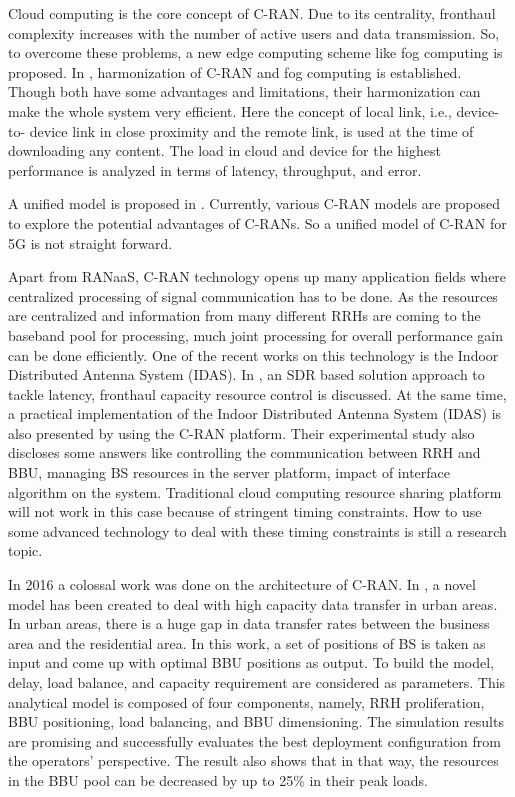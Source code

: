 \begin{multicols}{2}
Cloud computing is the core concept of C-RAN. Due to its centrality, fronthaul complexity increases with the number of active users and data transmission. So, to overcome these problems, a new edge computing scheme like fog computing is proposed. In \cite{art3-key21}, harmonization of C-RAN and fog computing is established. Though both have some advantages and limitations, their harmonization can make the whole system very efficient. Here the concept of local link, i.e., device-to- device link in close proximity and the remote link, is used at the time of downloading any content. The load in cloud and device for the highest performance is analyzed in terms of latency, throughput, and error.

A unified model is proposed in \cite{art3-key22}. Currently, various C-RAN models are proposed to explore the potential advantages of C-RANs. So a unified model of C-RAN for 5G is not straight forward.

Apart from RANaaS, C-RAN technology opens up many application fields where centralized processing of signal communication has to be done. As the resources are centralized and information from many different RRHs are coming to the baseband pool for processing, much joint processing for overall performance gain can be done efficiently. One of the recent works on this technology is the Indoor Distributed Antenna System (IDAS). In \cite{art3-key23}, an SDR based solution approach to tackle latency, fronthaul capacity resource control is discussed. At the same time, a practical implementation of the Indoor Distributed Antenna System (IDAS) is also presented by using the C-RAN platform. Their experimental study also discloses some answers like controlling the communication between RRH and BBU, managing BS resources in the server platform, impact of interface algorithm on the system. Traditional cloud computing resource sharing platform will not work in this case because of stringent timing constraints. How to use some advanced technology to deal with these timing constraints is still a research topic. 

In 2016 a colossal work was done on the architecture of C-RAN. In \cite{art3-key24}, a novel model has been created to deal with high capacity data transfer in urban areas. In urban areas, there is a huge gap in data transfer rates between the business area and the residential area. In this work, a set of positions of BS is taken as input and come up with optimal BBU positions as output. To build the model, delay, load balance, and capacity requirement are considered as parameters. This analytical model is composed of four components, namely, RRH proliferation, BBU positioning, load balancing, and BBU dimensioning. The simulation results are promising and successfully evaluates the best deployment configuration from the operators’ perspective. The result also shows that in that way, the resources in the BBU pool can be decreased by up to 25\% in their peak loads.


\end{multicols}

